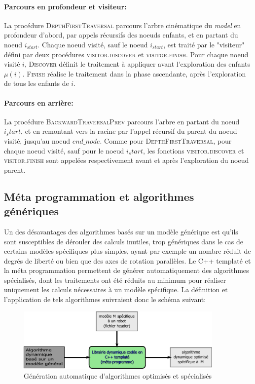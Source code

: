 \documentclass{report}
\begin{document}
\paragraph{Parcours en profondeur et visiteur:}
La procédure \textsc{DepthFirstTraversal} parcours l'arbre cinématique du \emph{model} en profondeur d'abord, par appels récursifs des noeuds enfants, et en partant du noeud $i_{start}$. Chaque noeud visité, sauf le noeud $i_{start}$, est traité par le "visiteur" défini par deux procédures \textsc{visitor.discover} et \textsc{visitor.finish}. Pour chaque noeud visité $i$, \textsc{Discover} définit le traitement à appliquer avant l'exploration des enfants $\mu(i)$. \textsc{Finish} réalise le traitement dans la phase ascendante, \cad après l'exploration de tous les enfants de $i$.

\paragraph{Parcours en arrière:}
La procédure \textsc{BackwardTraversalPrev} parcours l'arbre en partant du noeud $i_start$, et en remontant vers la racine par l'appel récursif du parent du noeud visité, jusqu'au noeud $end\_node$. Comme pour \textsc{DepthFirstTraversal}, pour chaque noeud visité, sauf pour le noeud $i_start$, les fonctions \textsc{visitor.discover} et \textsc{visitor.finish} sont appelées respectivement avant et après l'exploration du noeud parent.


\subsection{Méta programmation et algorithmes génériques}

Un des désavantages des algorithmes basés sur un modèle générique est qu'ils sont susceptibles de dérouler des calculs inutiles, trop génériques dans le cas de certains modèles spécifiques plus simples, ayant par exemple un nombre réduit de degrés de liberté ou bien que des axes de rotation parallèles. Le C++ templaté et la méta programmation permettent de générer automatiquement des algorithmes spécialisés, dont les traitements ont été réduits au minimum pour réaliser uniquement les calculs nécessaires à un modèle spécifique. La définition et l'application de tels algorithmes suivraient donc le schéma suivant:

\begin{figure}[H]
\centering
\includegraphics[width=0.9\textwidth]{figs/principeAlgoGenerique.pdf}
\caption{Génération automatique d'algorithmes optimisés et spécialisés}
\end{figure}
\end{document}
